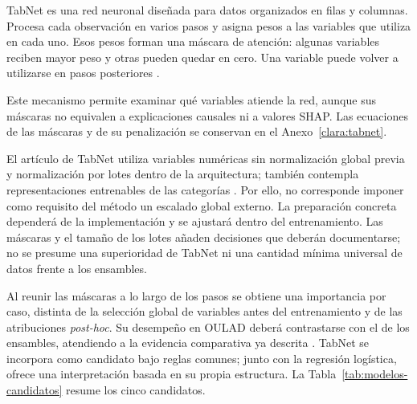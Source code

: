 TabNet es una red neuronal diseñada para datos organizados en filas y columnas. Procesa cada observación en varios pasos y asigna pesos a las variables que utiliza en cada uno. Esos pesos forman una máscara de atención: algunas variables reciben mayor peso y otras pueden quedar en cero. Una variable puede volver a utilizarse en pasos posteriores \cite{arXiv190807442}.

Este mecanismo permite examinar qué variables atiende la red, aunque sus máscaras no equivalen a explicaciones causales ni a valores SHAP. Las ecuaciones de las máscaras y de su penalización se conservan en el Anexo~\ref{clara:tabnet}.

El artículo de TabNet utiliza variables numéricas sin normalización global previa y normalización por lotes dentro de la arquitectura; también contempla representaciones entrenables de las categorías \cite{arXiv190807442}. Por ello, no corresponde imponer como requisito del método un escalado global externo. La preparación concreta dependerá de la implementación y se ajustará dentro del entrenamiento. Las máscaras y el tamaño de los lotes añaden decisiones que deberán documentarse; no se presume una superioridad de TabNet ni una cantidad mínima universal de datos frente a los ensambles.

Al reunir las máscaras a lo largo de los pasos se obtiene una importancia por caso, distinta de la selección global de variables antes del entrenamiento y de las atribuciones \textit{post-hoc}. Su desempeño en OULAD deberá contrastarse con el de los ensambles, atendiendo a la evidencia comparativa ya descrita \cite{shwartzziv2022,grinsztajn2022}. TabNet se incorpora como candidato bajo reglas comunes; junto con la regresión logística, ofrece una interpretación basada en su propia estructura. La Tabla~\ref{tab:modelos-candidatos} resume los cinco candidatos.

